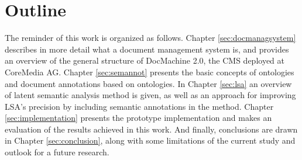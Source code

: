 \section{Outline}
\label{sec:introduction:outline}
The reminder of this work is organized as follows. Chapter \ref{sec:docmanagsystem} describes in more detail what a document management system is, and provides an overview of the general structure of DocMachine 2.0, the \gls{CMS} deployed at CoreMedia AG. Chapter \ref{sec:semannot} presents the basic concepts of ontologies and document annotations based on ontologies. In Chapter \ref{sec:lsa} an overview of latent semantic analysis method is given, as well as an approach for improving \gls{LSA}'s precision by including semantic annotations in the method. Chapter \ref{sec:implementation} presents the prototype implementation and makes an evaluation of the results achieved in this work. And finally, conclusions are drawn in Chapter \ref{sec:conclusion}, along with some limitations of the current study and outlook for a future research.   \\ 
